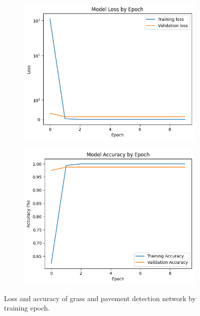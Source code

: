 \documentclass[titlepage, twocolumn]{article}
\begin{document}
            \begin{figure}
                \begin{center}
                    \begin{subfigure}{0.5\linewidth}
                        \centering
                        \includegraphics[width=0.9\linewidth]{grasspaveloss.png}
                      \end{subfigure}%
                      \begin{subfigure}{0.5\linewidth}
                        \centering
                        \includegraphics[width=0.9\linewidth]{grasspaveacc.png}
                      \end{subfigure}
                \end{center}
                \caption{Loss and accuracy of grass and pavement detection network by training epoch.}
                \label{fig:grasspavegraphs}
            \end{figure}
\end{document}
